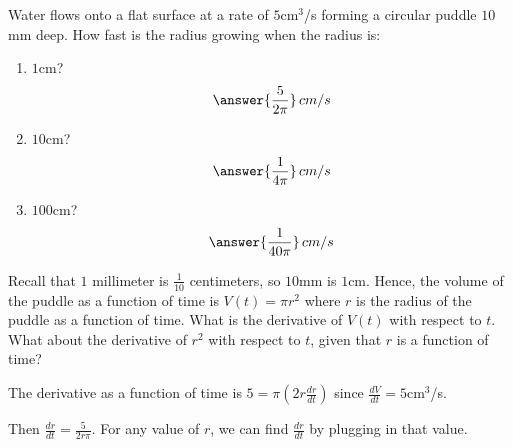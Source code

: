 \documentclass{ximera}
\author{Gregory Hartman \and Matthew Carr}
\begin{document}
\begin{exercise}



Water flows onto a flat surface at a rate of $5$cm$^3$/s forming a circular puddle $10$mm deep. How fast is the radius growing when the radius is:
\begin{enumerate}
\item		$1$cm? \[\answer{\frac{5}{2\pi}}\,cm/s\]
\item		$10$cm? \[\answer{\frac{1}{4\pi}}\,cm/s\]
\item		$100$cm? \[\answer{\frac{1}{40\pi}}\,cm/s\]

\end{enumerate}

\begin{hint}
Recall that $1$ millimeter is $\frac{1}{10}$ centimeters, so $10$mm is $1$cm. Hence, the volume of the puddle as a function of time is $V(t)=\pi r^2$ where $r$ is the radius of the puddle as a function of time. What is the derivative of $V(t)$ with respect to $t$. What about the derivative of $r^2$ with respect to $t$, given that $r$ is a function of time?
\end{hint}
\begin{hint}
The derivative as a function of time is $5=\pi(2r\frac{dr}{dt})$ since $\frac{dV}{dt}=5$cm$^3$/s.
\end{hint}
\begin{hint}
Then $\frac{dr}{dt}=\frac{5}{2r\pi}$. For any value of $r$, we can find $\frac{dr}{dt}$ by plugging in that value.
\end{hint}
\end{exercise}
\end{document}
